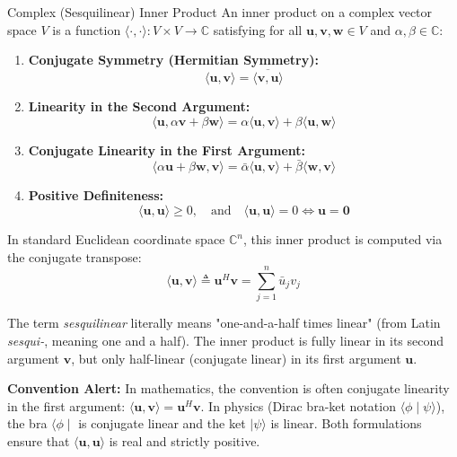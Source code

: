 \begin{definitionbox}{Complex (Sesquilinear) Inner Product}
An inner product on a complex vector space $V$ is a function $\langle \cdot, \cdot \rangle: V \times V \to \mathbb{C}$ satisfying for all $\mathbf{u}, \mathbf{v}, \mathbf{w} \in V$ and $\alpha, \beta \in \mathbb{C}$:
\begin{enumerate}
    \item \textbf{Conjugate Symmetry (Hermitian Symmetry):}
    \begin{equation}
    \langle \mathbf{u}, \mathbf{v} \rangle = \overline{\langle \mathbf{v}, \mathbf{u} \rangle}
    \end{equation}
    \item \textbf{Linearity in the Second Argument:}
    \begin{equation}
    \langle \mathbf{u}, \alpha \mathbf{v} + \beta \mathbf{w} \rangle = \alpha \langle \mathbf{u}, \mathbf{v} \rangle + \beta \langle \mathbf{u}, \mathbf{w} \rangle
    \end{equation}
    \item \textbf{Conjugate Linearity in the First Argument:}
    \begin{equation}
    \langle \alpha \mathbf{u} + \beta \mathbf{w}, \mathbf{v} \rangle = \bar{\alpha} \langle \mathbf{u}, \mathbf{v} \rangle + \bar{\beta} \langle \mathbf{w}, \mathbf{v} \rangle
    \end{equation}
    \item \textbf{Positive Definiteness:}
    \begin{equation}
    \langle \mathbf{u}, \mathbf{u} \rangle \ge 0, \quad \text{and} \quad \langle \mathbf{u}, \mathbf{u} \rangle = 0 \iff \mathbf{u} = \mathbf{0}
    \end{equation}
\end{enumerate}
In standard Euclidean coordinate space $\mathbb{C}^n$, this inner product is computed via the conjugate transpose:
\begin{equation}
\langle \mathbf{u}, \mathbf{v} \rangle \triangleq \mathbf{u}^H \mathbf{v} = \sum_{j=1}^n \bar{u}_j v_j
\label{eq:complex_inner_prod}
\end{equation}
\end{definitionbox}

\begin{tcolorbox}[colback=accent!5, colframe=accent!70, title={\textbf{Pedagogical Note: Sesquilinearity Explained}}]
The term \emph{sesquilinear} literally means "one-and-a-half times linear" (from Latin \emph{sesqui-}, meaning one and a half). The inner product is fully linear in its second argument $\mathbf{v}$, but only half-linear (conjugate linear) in its first argument $\mathbf{u}$.

\textbf{Convention Alert:} In mathematics, the convention is often conjugate linearity in the first argument: $\langle \mathbf{u}, \mathbf{v} \rangle = \mathbf{u}^H \mathbf{v}$. In physics (Dirac bra-ket notation $\langle \phi \mid \psi \rangle$), the bra $\langle \phi \mid$ is conjugate linear and the ket $\mid \psi \rangle$ is linear. Both formulations ensure that $\langle \mathbf{u}, \mathbf{u} \rangle$ is real and strictly positive.
\end{tcolorbox}


